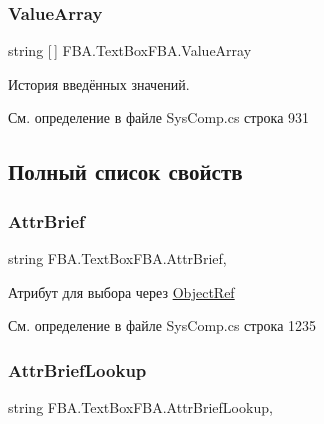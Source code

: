 \subsubsection{\texorpdfstring{Value\+Array}{ValueArray}}
{\footnotesize\ttfamily string \mbox{[}$\,$\mbox{]} F\+B\+A.\+Text\+Box\+F\+B\+A.\+Value\+Array}



История введённых значений. 



См. определение в файле Sys\+Comp.\+cs строка 931



\subsection{Полный список свойств}
\mbox{\label{class_f_b_a_1_1_text_box_f_b_a_a664835766a41c403bdbd1ef6a4252c36}} 
\subsubsection{\texorpdfstring{Attr\+Brief}{AttrBrief}}
{\footnotesize\ttfamily string F\+B\+A.\+Text\+Box\+F\+B\+A.\+Attr\+Brief\hspace{0.3cm}{\ttfamily [get]}, {\ttfamily [set]}}



Атрибут для выбора через \mbox{\hyperlink{class_f_b_a_1_1_object_ref}{Object\+Ref}} 



См. определение в файле Sys\+Comp.\+cs строка 1235

\mbox{\label{class_f_b_a_1_1_text_box_f_b_a_a5732584edb6adcbc5b678bc56f5c289f}} 
\subsubsection{\texorpdfstring{Attr\+Brief\+Lookup}{AttrBriefLookup}}
{\footnotesize\ttfamily string F\+B\+A.\+Text\+Box\+F\+B\+A.\+Attr\+Brief\+Lookup\hspace{0.3cm}{\ttfamily [get]}, {\ttfamily [set]}}





